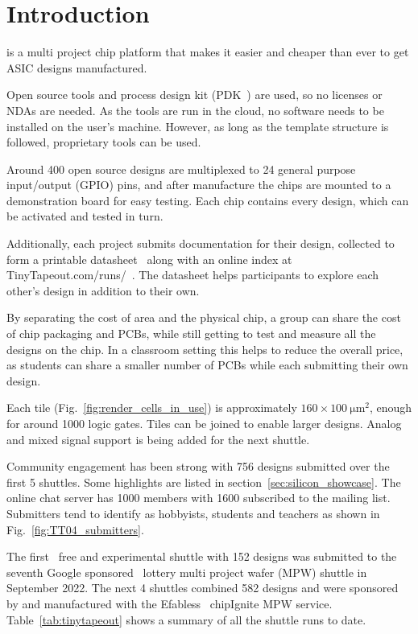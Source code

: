 \section{Introduction}
\label{sec:introduction}
 is a multi project chip platform that makes it easier and cheaper than ever to get ASIC designs manufactured.

Open source tools and process design kit (PDK~\cite{pdk}) are used, so no licenses or NDAs are needed. As the tools are run in the cloud, no software needs to be installed on the user's machine. However, as long as the template structure is followed, proprietary tools can be used.

Around 400 open source designs are multiplexed to 24 general purpose input/output (GPIO) pins, and after manufacture the chips are mounted to a demonstration board for easy testing. Each chip contains every design, which can be activated and tested in turn.

Additionally, each project submits documentation for their design, collected to form a printable datasheet~\cite{datasheet} along with an online index at TinyTapeout.com/runs/~\cite{tinytapeoutruns}. The datasheet helps participants to explore each other's design in addition to their own.

By separating the cost of area and the physical chip, a group can share the cost of chip packaging and PCBs, while still getting to test and measure all the designs on the chip. In a classroom setting this helps to reduce the overall price, as students can share a smaller number of PCBs while each submitting their own design.

Each tile (Fig.~\ref{fig:render_cells_in_use}) is approximately $160 \times \qty{100}{\micro\meter\squared}$, enough for around 1000 logic gates. Tiles can be joined to enable larger designs. Analog and mixed signal support is being added for the next shuttle.

Community engagement has been strong with 756 designs submitted over the first 5 shuttles. Some highlights are listed in section~\ref{sec:silicon_showcase}.
The online chat server has 1000 members with 1600 subscribed to the mailing list. Submitters tend to identify as hobbyists, students and teachers as shown in Fig.~\ref{fig:TT04_submitters}.

The first~\cite{firstshuttle} free and experimental shuttle with 152 designs was submitted to the seventh Google sponsored~\cite{googlesponsored} lottery multi project wafer (MPW) shuttle in September 2022.
The next 4 shuttles combined 582 designs and were sponsored by and manufactured with the Efabless~\cite{efabless} chipIgnite MPW service. Table~\ref{tab:tinytapeout} shows a summary of all the shuttle runs to date.


